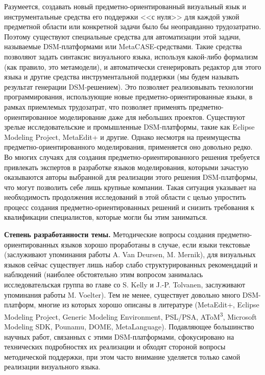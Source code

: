 Разумеется, создавать новый предметно-ориентированный визуальный язык и 
инструментальные средства его поддержки <<с нуля>> для каждой узкой предметной 
области или конкретной задачи было бы неоправданно трудозатратно. Поэтому 
существуют специальные средства для автоматизации этой задачи, называемые 
DSM-платформами или MetaCASE-средствами. Такие средства позволяют задать 
синтаксис визуального языка, используя какой-либо формализм (как правило, 
это метамодели), и автоматически сгенерировать редактор для этого языка и другие средства инструментальной 
поддержки (мы будем называть результат генерации DSM-решением). 
Это позволяет реализовывать технологии программирования, использующие новые предметно-ориентированные языки, в рамках приемлемых трудозатрат, 
что позволяет применять предметно-ориентированное моделирование даже для небольших проектов. Существуют зрелые исследовательские и промышленные 
DSM-платформы, такие как Eclipse Modeling Project, MetaEdit+ и другие. Однако 
несмотря на преимущества предметно-ориентированного моделирования, применяется оно 
довольно редко. Во многих случаях для создания предметно-ориентированного 
решения требуется привлекать экспертов в разработке языков моделирования, которыми зачастую 
оказываются авторы выбранной для реализации этого решения DSM-платформы, что могут
позволить себе лишь крупные компании. Такая ситуация указывает на 
необходимость продолжения исследований в этой области с целью упростить процесс создания
предметно-ориентированных решений и снизить требования к квалификации специалистов, 
которые могли бы этим заниматься.

\textbf{Степень разработанности темы.}
Методические вопросы создания предметно-ориентированных языков хорошо проработаны в случае, если 
языки текстовые (заслуживают упоминания работы A. Van Deursen, M. Mernik), для визуальных
языков сейчас существует лишь набор слабо структурированных рекомендаций и наблюдений
(наиболее обстоятельно этим вопросом занималась исследовательская группа во главе 
со S. Kelly и J.-P. Tolvanen, заслуживают упоминания работы M. Voelter). Тем не менее, 
существует довольно много DSM-платформ, многие из которых хорошо описаны в литературе 
(MetaEdit+, Eclipse Modeling Project, Generic Modeling Environment, PSL/PSA, AToM\textsuperscript{3},
Microsoft Modeling SDK, Pounamu, DOME, MetaLanguage). Подавляющее большинство 
научных работ, связанных с этими DSM-платформами, сфокусировано на технических подробностях
их реализации и обходят стороной вопросы методической поддержки, при этом часто внимание 
уделяется только самой реализации визуального языка.

